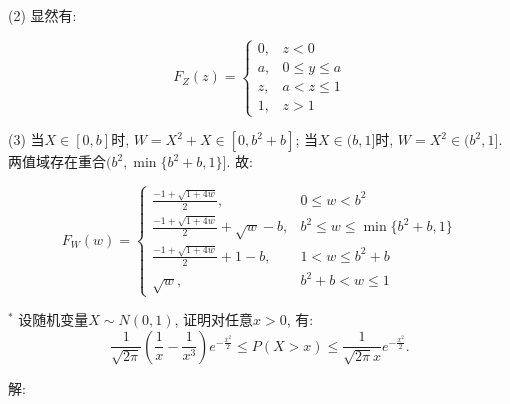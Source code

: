 \documentclass[standard]{ExBook}
\begin{document}
\begin{qitems}
\vspace{-5em}

    \begin{bbox}
(2) 显然有:
\vspace{-2em}
\begin{center}
\begin{equation}
    F_{Z}(z)=
    \left\{
    \begin{array}{cl}
        \nonumber
        0, &z<0\\
        a, &0\leq y\leq a\\
        z, &a<z\leq 1\\
        1, &z>1
    \end{array}
    \right.
\end{equation}
\end{center}
(3) 当$X\in[0,b]$时, $W=X^2+X\in[0,b^2+b]$; 当$X\in(b,1]$时, $W=X^2\in(b^2,1]$. 两值域存在重合$(b^2,\min\{b^2+b,1\}]$. 故:
\vspace{-2em}
\begin{center}
\begin{equation}
    F_{W}(w)=
    \left\{
    \begin{array}{cl}
        \nonumber
        \displaystyle\frac{-1+\sqrt{1+4w}}{2}, &0\leq w<b^2\\
        \displaystyle\frac{-1+\sqrt{1+4w}}{2}+\sqrt{w}-b, &b^2\leq w\leq\min\{b^2+b,1\}\\
        \displaystyle\frac{-1+\sqrt{1+4w}}{2}+1-b, &1< w\leq b^2+b\\
        \sqrt{w}, &b^2+b<w\leq 1
    \end{array}
    \right.
\end{equation}
\end{center}
    \end{bbox}

\vspace{-5em}

    \begin{bbox}
    \begin{shaded}
        \qitem$^{*}$
设随机变量$X\sim N(0,1)$, 证明对任意$x > 0$, 有:
$$\frac{1}{\sqrt{2\pi}}\left(\frac{1}{x}-\frac{1}{x^3}\right)e^{-\frac{x^2}{2}} \leq P(X>x) \leq \frac{1}{\sqrt{2\pi}x}e^{-\frac{x^2}{2}}.$$
    \end{shaded}
    \end{bbox}

\vspace{-5em}

    \begin{bbox}
解: 


\end{bbox}
\end{qitems}
\end{document}
